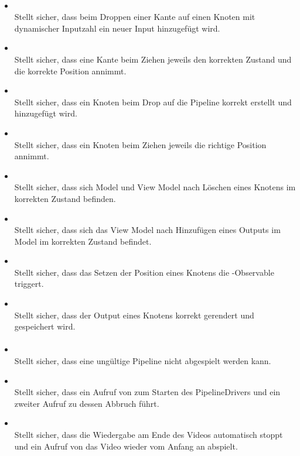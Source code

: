 \paragraph{}
\begin{itemize}
	\item {} \\
	Stellt sicher, dass beim Droppen einer Kante auf einen Knoten mit dynamischer Inputzahl ein neuer Input hinzugefügt wird.
	\item {} \\
	Stellt sicher, dass eine Kante beim Ziehen jeweils den korrekten Zustand und die korrekte Position annimmt.
	\item {} \\
	Stellt sicher, dass ein Knoten beim Drop auf die Pipeline korrekt erstellt und hinzugefügt wird.
	\item {} \\
	Stellt sicher, dass ein Knoten beim Ziehen jeweils die richtige Position annimmt.
	\item {} \\
	Stellt sicher, dass sich Model und View Model nach Löschen eines Knotens im korrekten Zustand befinden.
	\item {} \\
	Stellt sicher, dass sich das View Model nach Hinzufügen eines Outputs im Model im korrekten Zustand befindet.
	\item {} \\
	Stellt sicher, dass das Setzen der Position eines Knotens die -Observable triggert.
	\item {} \\
	Stellt sicher, dass der Output eines Knotens korrekt gerendert und gespeichert wird.
\end{itemize}

\paragraph{}
\begin{itemize}
	\item {} \\
	Stellt sicher, dass eine ungültige Pipeline nicht abgespielt werden kann.
	\item {} \\
	Stellt sicher, dass ein Aufruf von  zum Starten des PipelineDrivers und ein zweiter Aufruf zu dessen Abbruch führt.
	\item {} \\
	Stellt sicher, dass die Wiedergabe am Ende des Videos automatisch stoppt und ein Aufruf von  das Video wieder vom Anfang an abspielt.
\end{itemize}

